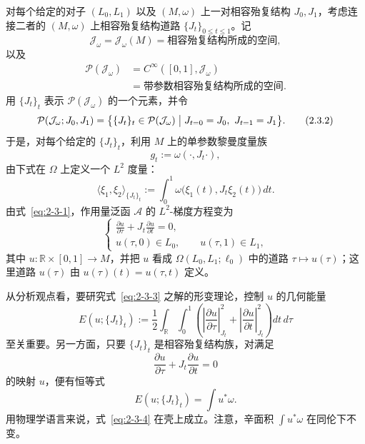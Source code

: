 对每个给定的对子 $(L_0,L_1)$ 以及 $(M,\omega)$ 上一对相容殆复结构
$J_0,J_1$，考虑连接二者的 $(M,\omega)$ 上相容殆复结构道路
$\{J_t\}_{0\leq t\leq1}$。记
\[
  \mathcal J_\omega=\mathcal J_\omega(M)
  =\text{相容殆复结构所成的空间},
\]
以及
\[
  \begin{split}
  \mathcal P(\mathcal J_\omega)
  &=C^\infty([0,1],\mathcal J_\omega)\\
  &=\text{带参数相容殆复结构所成的空间}.
  \end{split}
\]
用 $\{J_t\}_t$ 表示 $\mathcal P(\mathcal J_\omega)$ 的一个元素，并令
\begin{equation}
  \mathcal P(\mathcal J_\omega;J_0,J_1)
  =\bigl\{\{J_t\}_t\in\mathcal P(\mathcal J_\omega)
    \bigm|J_{t=0}=J_0,\ J_{t=1}=J_1\bigr\}.
  \tag{2.3.2}\label{eq:2-3-2}
\end{equation}
于是，对每个给定的 $\{J_t\}_t$，利用 $M$ 上的单参数黎曼度量族
\[
  g_t:=\omega(\mathord\cdot,J_t\mathord\cdot),
\]
由下式在 $\Omega$ 上定义一个 $L^2$ 度量：
\[
  \langle\xi_1,\xi_2\rangle_{\{J_t\}_t}
  :=\int_0^1\omega\bigl(\xi_1(t),J_t\xi_2(t)\bigr)\,dt.
\]
由式~\eqref{eq:2-3-1}，作用量泛函 $\mathcal A$ 的 $L^2$-梯度方程变为
\begin{equation}
  \begin{cases}
    \displaystyle\frac{\partial u}{\partial\tau}
      +J_t\frac{\partial u}{\partial t}=0,\\[6pt]
    u(\tau,0)\in L_0,
      \qquad u(\tau,1)\in L_1,
  \end{cases}
  \tag{2.3.3}\label{eq:2-3-3}
\end{equation}
其中 $u:\mathbb R\times[0,1]\to M$，并把 $u$ 看成
$\Omega(L_0,L_1;\ell_0)$ 中的道路 $\tau\mapsto u(\tau)$；这里道路
$u(\tau)$ 由 $u(\tau)(t)=u(\tau,t)$ 定义。

从分析观点看，要研究式~\eqref{eq:2-3-3} 之解的形变理论，控制 $u$ 的几何能量
\[
  E(u;\{J_t\}_t)
  :=\frac12\int_{\mathbb R}\int_0^1
    \left(
      \left|\frac{\partial u}{\partial\tau}\right|_{J_t}^{2}
      +\left|\frac{\partial u}{\partial t}\right|_{J_t}^{2}
    \right)dt\,d\tau
\]
至关重要。另一方面，只要 $\{J_t\}_t$ 是相容殆复结构族，对满足
\[
  \frac{\partial u}{\partial\tau}
  +J_t\frac{\partial u}{\partial t}=0
\]
的映射 $u$，便有恒等式
\begin{equation}
  E(u;\{J_t\}_t)=\int u^*\omega.
  \tag{2.3.4}\label{eq:2-3-4}
\end{equation}
用物理学语言来说，式~\eqref{eq:2-3-4} 在壳上成立。注意，辛面积
$\int u^*\omega$ 在同伦下不变。

